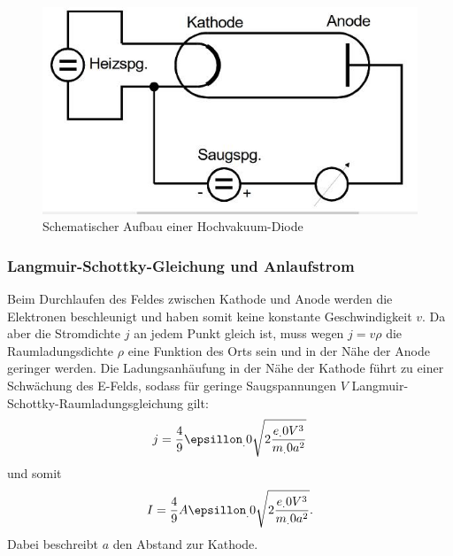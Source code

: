 \begin{figure}
\centering
\includegraphics[width=\linewidth-70pt,height=\textheight-70pt,keepaspectratio]{content/images/HVD.jpg}
\caption{Schematischer Aufbau einer Hochvakuum-Diode\cite{V504}
\label{fig:HVD}}
\end{figure}
\subsubsection{Langmuir-Schottky-Gleichung und Anlaufstrom}
Beim Durchlaufen des Feldes zwischen Kathode und Anode werden die Elektronen beschleunigt und haben somit keine konstante Geschwindigkeit $v$.
Da aber die Stromdichte $j$ an jedem Punkt gleich ist, muss wegen $j=v\rho$
die Raumladungsdichte $\rho$ eine Funktion des Orts sein und in der Nähe der Anode geringer werden. Die Ladungsanhäufung in der Nähe der Kathode führt zu einer Schwächung des E-Felds, sodass für geringe Saugspannungen $V$ Langmuir-Schottky-Raumladungsgleichung gilt:
\begin{equation*}
j = \frac{4}{9}\epsillon_.0\sqrt{2\frac{e_.0V^3}{m_.0a^2}}
\end{equation*}
und somit
\begin{equation}
I = \frac{4}{9}A\epsillon_.0\sqrt{2\frac{e_.0V^3}{m_.0a^2}}\text{.}
\label{eq:langmuir}
\end{equation}
Dabei beschreibt $a$ den Abstand zur Kathode.